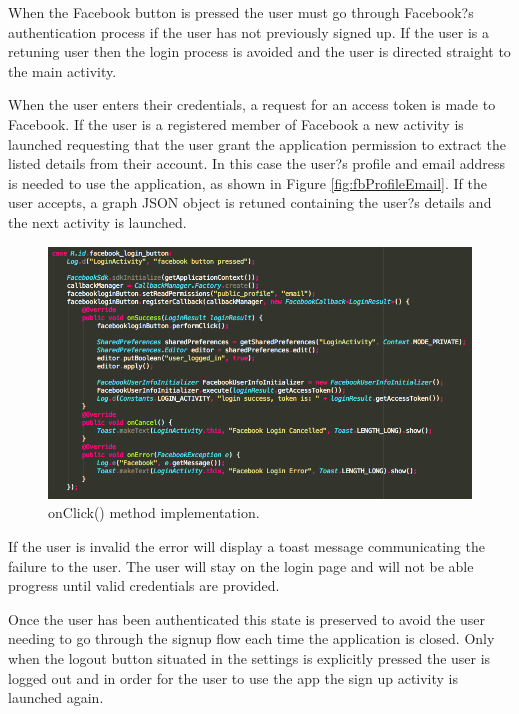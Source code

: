 \documentclass[a4paper, 11pt]{article}
\begin{document}
When the Facebook button is pressed the  user must go through Facebook?s authentication process if the user has not previously signed up. If the user is a retuning user then the login process is avoided and the user is directed straight to the main activity.  

When the user enters their credentials, a request for an access token is made to Facebook. If the user is a registered member of Facebook a new activity is launched requesting that the user grant the application permission to extract the listed details from their account. In this case the user?s profile and email address is needed to use the application, as shown in Figure \ref{fig:fbProfileEmail}. If the user accepts, a graph JSON object is retuned containing the user?s details and the next activity is launched.

\begin{figure}[h]
\centering
\includegraphics[width=\textwidth]{fbProfileEmail}
\caption{onClick() method implementation.}
\end{figure}

If the user is invalid the error will display a toast message communicating the failure to the user. The user will stay on the login page and will not be able progress until valid credentials are provided. 

Once the user has been authenticated this state is preserved to avoid the user needing to go through the signup flow each time the application is closed. Only when the logout button situated in the settings is explicitly pressed the user is logged out and in order for the user to use the app the sign up activity is launched again. 
\end{document}
